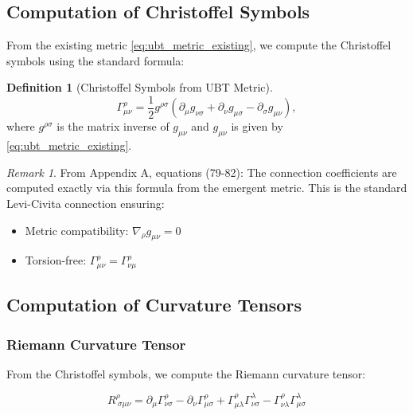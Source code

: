 \documentclass[12pt]{article}
\theoremstyle{definition}
\newtheorem{definition}[theorem]{Definition}
\theoremstyle{remark}
\newtheorem{remark}[theorem]{Remark}
\begin{document}
\subsection{Computation of Christoffel Symbols}

From the existing metric \eqref{eq:ubt_metric_existing}, we compute the Christoffel symbols using the standard formula:

\begin{definition}[Christoffel Symbols from UBT Metric]
\begin{equation}
\Gamma^\rho_{\mu\nu} = \frac{1}{2}g^{\rho\sigma}\left(\partial_\mu g_{\nu\sigma} + \partial_\nu g_{\mu\sigma} - \partial_\sigma g_{\mu\nu}\right),
\label{eq:christoffel_ubt}
\end{equation}
where $g^{\rho\sigma}$ is the matrix inverse of $g_{\mu\nu}$ and $g_{\mu\nu}$ is given by \eqref{eq:ubt_metric_existing}.
\end{definition}

\begin{remark}
From Appendix A, equations (79-82): The connection coefficients are computed exactly via this formula from the emergent metric. This is the standard Levi-Civita connection ensuring:
\begin{itemize}
    \item Metric compatibility: $\nabla_\rho g_{\mu\nu} = 0$
    \item Torsion-free: $\Gamma^\rho_{\mu\nu} = \Gamma^\rho_{\nu\mu}$
\end{itemize}
\end{remark}

\subsection{Computation of Curvature Tensors}

\subsubsection{Riemann Curvature Tensor}

From the Christoffel symbols, we compute the Riemann curvature tensor:

\begin{equation}
R^\rho_{\ \sigma\mu\nu} = \partial_\mu \Gamma^\rho_{\nu\sigma} - \partial_\nu \Gamma^\rho_{\mu\sigma} + \Gamma^\rho_{\mu\lambda}\Gamma^\lambda_{\nu\sigma} - \Gamma^\rho_{\nu\lambda}\Gamma^\lambda_{\mu\sigma}
\label{eq:riemann_ubt}
\end{equation}
\end{document}
